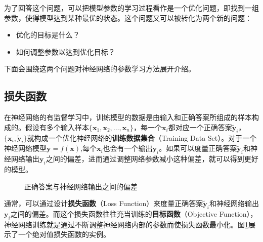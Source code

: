 \vspace{-2.5em}
\parinterval 为了回答这个问题，可以把模型参数的学习过程看作是一个优化问题，即找到一组参数，使得模型达到某种最优的状态。这个问题又可以被转化为两个新的问题：

\begin{itemize}
\vspace{0.5em}
\item 优化的目标是什么？
\vspace{0.5em}
\item 如何调整参数以达到优化目标？
\vspace{0.5em}
\end{itemize}

\parinterval 下面会围绕这两个问题对神经网络的参数学习方法展开介绍。


\subsection{损失函数}

\parinterval 在神经网络的有监督学习中，训练模型的数据是由输入和正确答案所组成的样本构成的。假设有多个输入样本$ \{\mathbf x_1,\mathbf x_2,\dots,\mathbf x_n\} $，每一个$ \mathbf x_i $都对应一个正确答案$ \mathbf {\widetilde y}_i $，$ \{\mathbf x_i,\mathbf {\widetilde y}_i\} $就构成一个优化神经网络的{\small\sffamily\bfseries{训练数据集合}}（Training Data Set）。对于一个神经网络模型$ \mathbf y=f(\mathbf x) $,每个$ \mathbf x_i $也会有一个输出$ \mathbf y_i $。如果可以度量正确答案$ \mathbf {\widetilde y}_i $和神经网络输出$ \mathbf y_i $之间的偏差，进而通过调整网络参数减小这种偏差，就可以得到更好的模型。

\begin{figure}[htp]
\centering

\caption{正确答案与神经网络输出之间的偏差}
\label{fig:5-42}
\end{figure}

\parinterval 通常，可以通过设计{\small\sffamily\bfseries{损失函数}}（Loss Function）来度量正确答案$ \mathbf {\widetilde y}_i $和神经网络输出$ \mathbf y_i $之间的偏差。而这个损失函数往往充当训练的{\small\sffamily\bfseries{目标函数}}（Objective Function），神经网络训练就是通过不断调整神经网络内部的参数而使损失函数最小化。图\ref{fig:5-42}展示了一个绝对值损失函数的实例。


